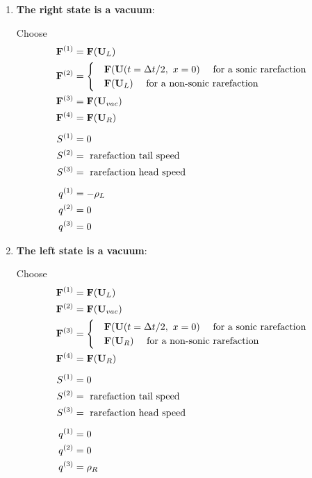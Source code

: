 \begin{enumerate}

	\item 	\textbf{The right state is a vacuum}:
	
			Choose 
			\begin{align*}
				\mathbf{F}^{(1)} &= \mathbf{F}(\mathbf{U}_L)\\
				\mathbf{F}^{(2)} &= \begin{cases}
								&\mathbf{F}(\mathbf{U}(t = \Delta t/2, \ x = 0) \quad \text{ for a sonic rarefaction } \\
								&\mathbf{F}(\mathbf{U}_L) \quad \text{ for a non-sonic rarefaction } \\
							\end{cases}\\
				\mathbf{F}^{(3)} &= \mathbf{F}(\mathbf{U}_{vac})\\
				\mathbf{F}^{(4)} &= \mathbf{F}(\mathbf{U}_R)\\[.5em]
				S^{(1)} &= 0\\
				S^{(2)} &= \text{ rarefaction tail speed}\\
				S^{(3)} &= \text{ rarefaction head speed}\\[.5em]
				q^{(1)} &= -\rho_L\\
				q^{(2)} &= 0\\
				q^{(3)} &= 0\\							
			\end{align*}

	
	\item 	\textbf{The left state is a vacuum}:
			
			Choose 
			\begin{align*}
				\mathbf{F}^{(1)} &= \mathbf{F}(\mathbf{U}_L)\\
				\mathbf{F}^{(2)} &= \mathbf{F}(\mathbf{U}_{vac})\\
				\mathbf{F}^{(3)} &= \begin{cases}
								&\mathbf{F}(\mathbf{U}(t = \Delta t/2, \ x = 0) \quad \text{ for a sonic rarefaction } \\
								&\mathbf{F}(\mathbf{U}_R) \quad \text{ for a non-sonic rarefaction } \\
							\end{cases}\\
				\mathbf{F}^{(4)} &= \mathbf{F}(\mathbf{U}_R)\\[.5em]
				S^{(1)} &= 0\\
				S^{(2)} &= \text{ rarefaction tail speed}\\
				S^{(3)} &= \text{ rarefaction head speed}\\[.5em]
				q^{(1)} &= 0\\
				q^{(2)} &= 0\\
				q^{(3)} &= \rho_R\\							
			\end{align*}


\end{enumerate}
